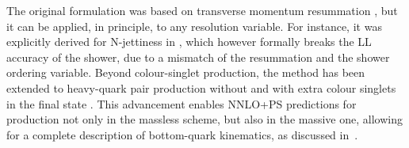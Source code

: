 \documentclass[11pt,a4paper]{article}
\begin{document}
The original \minnlo{} formulation was based on transverse momentum resummation \cite{Monni:2019whf,Monni:2020nks}, but it 
can be applied, in principle, to any resolution variable. For instance, it was explicitly derived for N-jettiness in ,
which however formally breaks the LL accuracy of the shower, due to a mismatch of the resummation and the shower ordering variable. 
Beyond colour-singlet production, the \minnlo{} method has been extended to heavy-quark pair production without \cite{mazzitelli:2020jio,mazzitelli:2021mmm}
and with extra colour singlets in the final state \cite{mazzitelli:2024ura}. This advancement enables NNLO+PS predictions for \bbH{} production
not only in the massless scheme, but also in the massive one, allowing for a complete description of bottom-quark kinematics, as discussed in~.
\end{document}
